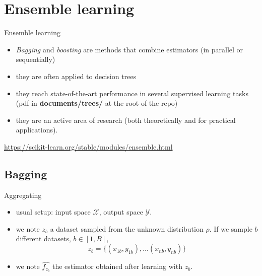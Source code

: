 \documentclass[usenames,dvipsnames]{beamer}
\begin{document}
\section{Ensemble learning}%
\frame{\tableofcontents[currentsection]}
\label{sec:ensemble_learning}

\begin{frame}{Ensemble learning}
    \begin{itemize}
	\item \textit{{Bagging}}  and \textit{{boosting}} are methods that combine estimators (in parallel or sequentially)
	\item they are often applied to decision trees
	\item they reach state-of-the-art performance in several supervised learning tasks \cite{Fernandez-Delgado2014}  (pdf in \textbf{documents/trees/} at the root of the repo)
	\item they are an active area of research (both theoretically and for practical applications).
    \end{itemize}

    \url{https://scikit-learn.org/stable/modules/ensemble.html} 
\end{frame}

\subsection{Bagging}%
\label{sub:bagging}


\begin{frame}{Aggregating}
    \begin{itemize}
        \item usual setup: input space $ \mathcal{X} $, output space $ \mathcal{Y} $.
	\item we note $z_b$ a dataset sampled from the unknown distribution $
        \rho$. If we sample $b$ different datasets, $b\in [1, B]$, 
	    \begin{equation}
		z_b = \{(x_{1b}, y_{1b}), \dots (x_{nb}, y_{nb})\}
	    \end{equation}
	\item we note $ \hat{f_{z_b}}$ the estimator obtained after learning with $ z_b$.
    \end{itemize}
\end{frame}
\end{document}
